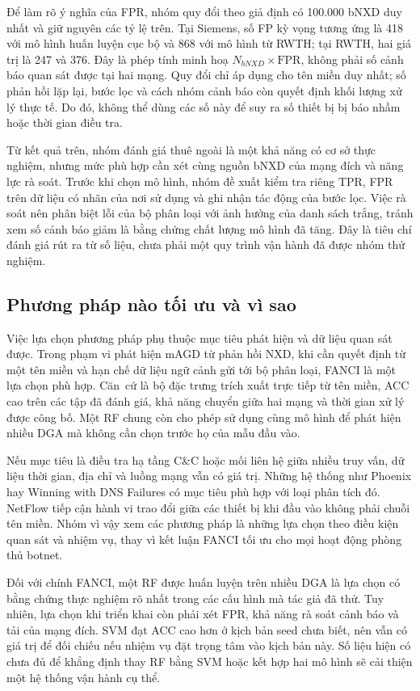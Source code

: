 Để làm rõ ý nghĩa của FPR, nhóm quy đổi theo giả định có 100.000 bNXD duy nhất và giữ nguyên các tỷ lệ trên. Tại Siemens, số FP kỳ vọng tương ứng là 418 với mô hình huấn luyện cục bộ và 868 với mô hình từ RWTH; tại RWTH, hai giá trị là 247 và 376. Đây là phép tính minh hoạ $N_{bNXD}\times\mathrm{FPR}$, không phải số cảnh báo quan sát được tại hai mạng. Quy đổi chỉ áp dụng cho tên miền duy nhất; số phản hồi lặp lại, bước lọc và cách nhóm cảnh báo còn quyết định khối lượng xử lý thực tế. Do đó, không thể dùng các số này để suy ra số thiết bị bị báo nhầm hoặc thời gian điều tra.

Từ kết quả trên, nhóm đánh giá thuê ngoài là một khả năng có cơ sở thực nghiệm, nhưng mức phù hợp cần xét cùng nguồn bNXD của mạng đích và năng lực rà soát. Trước khi chọn mô hình, nhóm đề xuất kiểm tra riêng TPR, FPR trên dữ liệu có nhãn của nơi sử dụng và ghi nhận tác động của bước lọc. Việc rà soát nên phân biệt lỗi của bộ phân loại với ảnh hưởng của danh sách trắng, tránh xem số cảnh báo giảm là bằng chứng chất lượng mô hình đã tăng. Đây là tiêu chí đánh giá rút ra từ số liệu, chưa phải một quy trình vận hành đã được nhóm thử nghiệm.

\subsection{Phương pháp nào tối ưu và vì sao}\label{sec:toi-uu}

Việc lựa chọn phương pháp phụ thuộc mục tiêu phát hiện và dữ liệu quan sát được. Trong phạm vi phát hiện mAGD từ phản hồi NXD, khi cần quyết định từ một tên miền và hạn chế dữ liệu ngữ cảnh gửi tới bộ phân loại, FANCI là một lựa chọn phù hợp. Căn~cứ là bộ đặc trưng trích xuất trực tiếp từ tên miền, ACC cao trên các tập đã đánh giá, khả năng chuyển giữa hai mạng và thời gian xử lý được công bố. Một RF chung còn cho phép sử dụng cùng mô hình để phát hiện nhiều DGA mà không cần chọn trước họ của mẫu đầu vào.

Nếu mục tiêu là điều tra hạ tầng C\&C hoặc mối liên hệ giữa nhiều truy vấn, dữ liệu thời gian, địa chỉ và luồng mạng vẫn có giá trị. Những hệ thống như Phoenix hay Winning with DNS Failures có mục tiêu phù hợp với loại phân tích đó. NetFlow tiếp cận hành vi trao đổi giữa các thiết bị khi đầu vào không phải chuỗi tên miền. Nhóm vì vậy xem các phương pháp là những lựa chọn theo điều kiện quan sát và nhiệm vụ, thay vì kết luận FANCI tối ưu cho mọi hoạt động phòng thủ botnet.

Đối với chính FANCI, một RF được huấn luyện trên nhiều DGA là lựa chọn có bằng chứng thực nghiệm rõ nhất trong các cấu hình mà tác giả đã thử. Tuy nhiên, lựa chọn khi triển khai còn phải xét FPR, khả năng rà soát cảnh báo và tải của mạng đích. SVM đạt ACC cao hơn ở kịch bản seed chưa biết, nên vẫn có giá trị để đối chiếu nếu nhiệm vụ đặt trọng tâm vào kịch bản này. Số liệu hiện có chưa đủ để khẳng định thay RF bằng SVM hoặc kết hợp hai mô hình sẽ cải thiện một hệ thống vận hành cụ thể.


